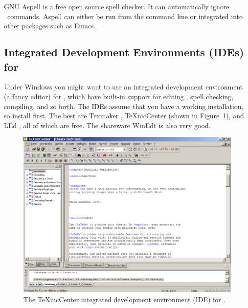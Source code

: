 GNU Aspell \parencite{Aspell} is a free open source spell checker.  It can
automatically ignore \LaTeXe\ commands. Aspell can either be run from
the command line or integrated into other packages such as Emacs.





\subsection{Integrated Development Environments (IDEs) for \protect\LaTeXe}

Under Windows you might want to use an integrated development
environment (a fancy editor) for \LaTeXe, which have built-in support
for editing \LaTeXe, spell checking, compiling, and so forth.
The IDEs assume that you have a working \LaTeXe installation,
so install \LaTeXe first.
%
The best are Texmaker \parencite{texmaker}, TeXnicCenter
\parencite{TeXnicCenter} (shown in Figure~\ref{fig:TeXnicCenter}), and LEd
\parencite{LEd}, all of which are free. The shareware WinEdt
\parencite{WinEdt} is also very good.


\begin{figure}[tp]
\centering
\includegraphics[keepaspectratio,width=\linewidth,height=\halfh]
{images/texnic.png}

\caption[The TeXnicCenter IDE]{
The TeXnicCenter \parencite{TeXnicCenter} integrated development
environment (IDE) for \LaTeXe.
}
\label{fig:TeXnicCenter}
\end{figure}








